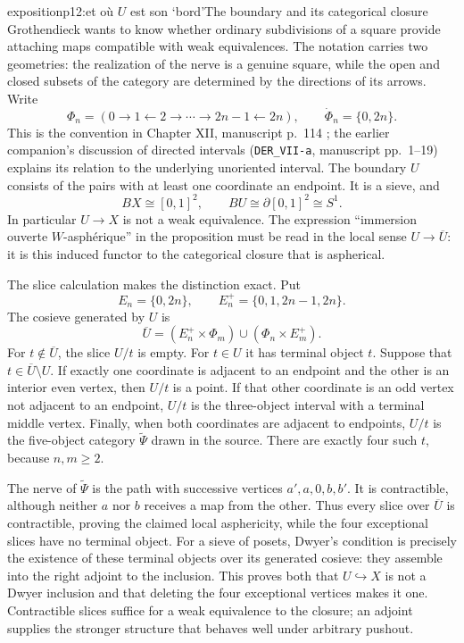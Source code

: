 \begin{dcomment}{exposition}{p12:et où $U$ est son ‘bord’}{The boundary and its categorical closure}
Grothendieck wants to know whether ordinary subdivisions of a square provide attaching maps compatible with weak equivalences. The notation carries two geometries: the realization of the nerve is a genuine square, while the open and closed subsets of the category are determined by the directions of its arrows. Write
\[
 \Phi_n=(0\longrightarrow1\longleftarrow2\longrightarrow\cdots
                \longrightarrow2n-1\longleftarrow2n),
 \qquad \dot\Phi_n=\{0,2n\}.
\]
This is the convention in Chapter XII, manuscript p.~114 \citep{Grothendieck1990XII}; the earlier companion's discussion of directed intervals (\texttt{DER\_VII-a}, manuscript pp.~1--19) explains its relation to the underlying unoriented interval. The boundary $U$ consists of the pairs with at least one coordinate an endpoint. It is a sieve, and
\[
 BX\cong[0,1]^2,\qquad BU\cong\partial[0,1]^2\cong S^1.
\]
In particular $U\to X$ is not a weak equivalence. The expression ``immersion ouverte $W$-asph\'erique'' in the proposition must be read in the local sense $U\to\overline U$: it is this induced functor to the categorical closure that is aspherical.

The slice calculation makes the distinction exact. Put
\[
 E_n=\{0,2n\},\qquad E_n^+=\{0,1,2n-1,2n\}.
\]
The cosieve generated by $U$ is
\[
 \overline U=(E_n^+\times\Phi_m)\cup(\Phi_n\times E_m^+).
\]
For $t\notin\overline U$, the slice $U/t$ is empty. For $t\in U$ it has terminal object $t$. Suppose that $t\in\overline U\setminus U$. If exactly one coordinate is adjacent to an endpoint and the other is an interior even vertex, then $U/t$ is a point. If that other coordinate is an odd vertex not adjacent to an endpoint, $U/t$ is the three-object interval with a terminal middle vertex. Finally, when both coordinates are adjacent to endpoints, $U/t$ is the five-object category $\widetilde\Psi$ drawn in the source. There are exactly four such $t$, because $n,m\geq2$.

The nerve of $\widetilde\Psi$ is the path with successive vertices $a',a,0,b,b'$. It is contractible, although neither $a$ nor $b$ receives a map from the other. Thus every slice over $\overline U$ is contractible, proving the claimed local asphericity, while the four exceptional slices have no terminal object. For a sieve of posets, Dwyer's condition is precisely the existence of these terminal objects over its generated cosieve: they assemble into the right adjoint to the inclusion. This proves both that $U\hookrightarrow X$ is not a Dwyer inclusion and that deleting the four exceptional vertices makes it one. Contractible slices suffice for a weak equivalence to the closure; an adjoint supplies the stronger structure that behaves well under arbitrary pushout.
\end{dcomment}

